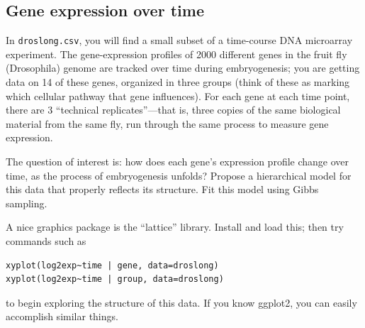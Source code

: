 \documentclass{article}
\begin{document}
\subsection{Gene expression over time}

In \verb|droslong.csv|, you will find a small subset of a time-course DNA microarray experiment.  The gene-expression profiles of 2000 different genes in the fruit fly (Drosophila) genome are tracked over time during embryogenesis; you are getting data on 14 of these genes, organized in three groups (think of these as marking which cellular pathway that gene influences).  For each gene at each time point, there are 3 ``technical replicates''---that is, three copies of the same biological material from the same fly, run through the same process to measure gene expression.

The question of interest is: how does each gene's expression profile change over time, as the process of embryogenesis unfolds?  Propose a hierarchical model for this data that properly reflects its structure.  Fit this model using Gibbs sampling.

A nice graphics package is the ``lattice'' library.  Install and load this; then try commands such as
\begin{verbatim}
xyplot(log2exp~time | gene, data=droslong)
xyplot(log2exp~time | group, data=droslong)
\end{verbatim}
to begin exploring the structure of this data.  If you know ggplot2, you can easily accomplish similar things.
\end{document}
